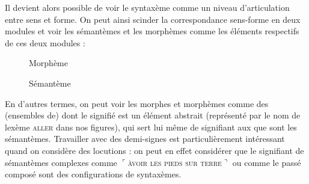 Il devient alors possible de voir le syntaxème comme un niveau d’articulation entre sens et forme. On peut ainsi scinder la correspondance sens-forme en deux modules et voir les sémantèmes et les morphèmes comme les éléments respectifs de ces deux modules :

\begin{figure}
\caption{Morphème\label{fig:}}
\end{figure}

\begin{figure}
\caption{Sémantème}    
\end{figure}

En d’autres termes, on peut voir les morphes et morphèmes comme des (ensembles de)  dont le signifié est un élément abstrait (représenté par le nom de lexème \textsc{aller} dans nos figures), qui sert lui même de signifiant aux  que sont les sémantèmes. Travailler avec des demi-signes est particulièrement intéressant quand on considère des locutions : on peut en effet considérer que le signifiant de sémantèmes complexes comme $⌜$\textsc{àvoir} \textsc{les} \textsc{pieds} \textsc{sur} \textsc{terre}$⌝$ ou comme le passé composé sont des configurations de syntaxèmes.

